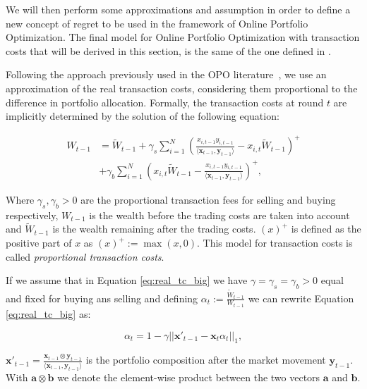 We will then perform some approximations and assumption in order to define a new concept of regret to be used in the framework of Online Portfolio Optimization. The final model for Online Portfolio Optimization with transaction costs that will be derived in this section, is the same of the one defined in \cite{das2013online}.

Following the approach previously used in the OPO literature~\cite{blum1999universal}, we use an approximation of the real transaction costs, considering them proportional to the difference in portfolio allocation.
Formally, the transaction costs at round $t$ are implicitly determined by the solution of the following equation:

\begin{align}\label{eq:real_tc_big}
W_{t-1}&=\tilde W_{t-1}+\gamma_s\sum\limits_{i=1}^N\left(\frac{x_{i,t-1}y_{i,t-1}}{\langle \mathbf x_{t-1},\mathbf y_{t-1}\rangle}-x_{i,t}\tilde W_{t-1}\right)^+\\\nonumber
&+\gamma_b\sum\limits_{i=1}^N\left(x_{i,t}\tilde W_{t-1}-\frac{x_{i,t-1}y_{i,t-1}}{\langle \mathbf x_{t-1},\mathbf y_{t-1}\rangle}\right)^+,
\end{align}

Where $\gamma_s,\gamma_b>0$ are the proportional transaction fees for selling and buying respectively, $W_{t-1}$ is the wealth before the trading costs are taken into account and $\tilde W_{t-1}$ is the wealth remaining after the trading costs. $(x)^+$ is defined as the positive part of $x$ as $(x)^+:=\max(x,0)$.
This model for transaction costs is called \emph{proportional transaction costs}. 

If we assume that in Equation \eqref{eq:real_tc_big} we have $\gamma=\gamma_s=\gamma_b>0$ equal and fixed for buying ans selling and defining $\alpha_t:=\frac{\tilde W_{t-1}}{W_{t-1}}$ we can rewrite Equation \eqref{eq:real_tc_big} as:

\begin{equation}\label{eq:real_tc}
   \alpha_t = 1 - \gamma ||\mathbf{x}'_{t-1}-\mathbf{x}_t \alpha_{t} ||_1,
\end{equation}


$\mathbf{x'}_{t-1} = \frac{\mathbf{x}_{t-1} \otimes \mathbf{y}_{t-1} }{\langle \mathbf{x}_{t-1}, \mathbf{y}_{t-1} \rangle }$ is the portfolio composition after the market movement $\mathbf{y}_{t-1}$.  With $ \mathbf{a} \otimes \mathbf{b}$ we denote the element-wise product between the two vectors $\mathbf{a}$ and $\mathbf{b}$.

